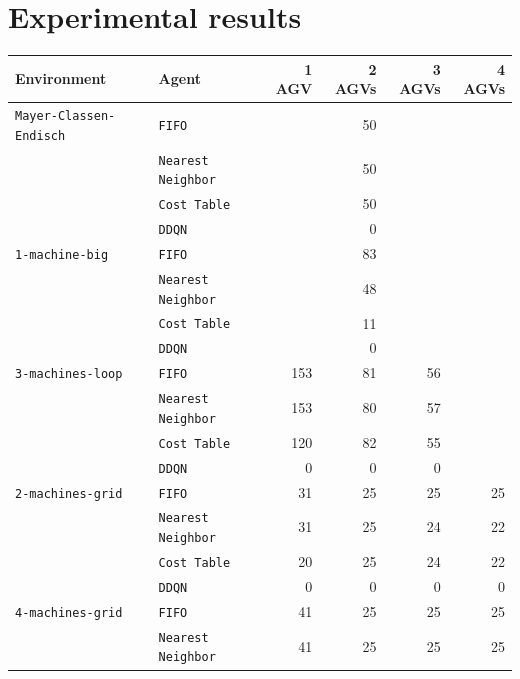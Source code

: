 \documentclass[sn-mathphys]{sn-jnl}
\begin{document}
\section{Experimental results}
\label{sec:results}


\begin{table}[ht]
\centering
\bgroup
\def\arraystretch{1.1} %
    
\begin{tabular}{|l|l||r|r|r|r|}
\hline
Environment & Agent & 1 AGV & 2 AGVs & 3 AGVs & 4 AGVs \\
\hline \texttt{Mayer-Classen-Endisch} & \texttt{FIFO}& & 50  \quad & &  \\ 
 & \texttt{Nearest Neighbor} & & 50  \quad & &  \\ 
 & \texttt{Cost Table} & & 50  \quad & &  \\ 
 & \texttt{DDQN} & & 0  \quad & &  \\ 
\hline \texttt{1-machine-big} & \texttt{FIFO}& & 83  \quad & &  \\ 
 & \texttt{Nearest Neighbor} & & 48  \quad & &  \\ 
 & \texttt{Cost Table} & & 11  \quad & &  \\ 
 & \texttt{DDQN} & & 0  \quad & &  \\ 
\hline \texttt{3-machines-loop} & \texttt{FIFO}& 153  \quad & 81  \quad & 56  \quad &  \\ 
 & \texttt{Nearest Neighbor} & 153  \quad & 80  \quad & 57  \quad &  \\ 
 & \texttt{Cost Table} & 120  \quad & 82  \quad & 55  \quad &  \\ 
 & \texttt{DDQN} & 0  \quad & 0  \quad & 0  \quad &  \\ 
\hline \texttt{2-machines-grid} & \texttt{FIFO}& 31  \quad & 25  \quad & 25  \quad & 25  \quad  \\ 
 & \texttt{Nearest Neighbor} & 31  \quad & 25  \quad & 24  \quad & 22  \quad  \\ 
 & \texttt{Cost Table} & 20  \quad & 25  \quad & 24  \quad & 22  \quad  \\ 
 & \texttt{DDQN} & 0  \quad & 0  \quad & 0  \quad & 0  \quad  \\ 
\hline \texttt{4-machines-grid} & \texttt{FIFO}& 41  \quad & 25  \quad & 25  \quad & 25  \quad  \\ 
 & \texttt{Nearest Neighbor} & 41  \quad & 25  \quad & 25  \quad & 25  \quad  \\ 

\end{tabular}
\end{table}
\end{document}
